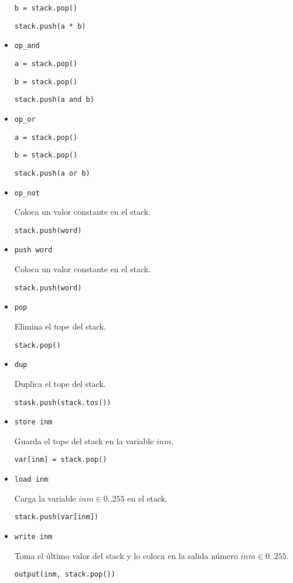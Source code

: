 \begin{itemize}
  \texttt{b = stack.pop()}

  \texttt{stack.push(a * b)}

\item \texttt{op\_and}

  \texttt{a = stack.pop()}

  \texttt{b = stack.pop()}

  \texttt{stack.push(a and b)}

\item \texttt{op\_or}

  \texttt{a = stack.pop()}

  \texttt{b = stack.pop()}

  \texttt{stack.push(a or b)}

\item \texttt{op\_not}

  Coloca un valor constante en el stack.

  \texttt{stack.push(word)}

\item \texttt{push word}

  Coloca un valor constante en el stack.

  \texttt{stack.push(word)}

\item \texttt{pop}

  Elimina el tope del stack.

  \texttt{stack.pop()}

\item \texttt{dup}

  Duplica el tope del stack.

  \texttt{stask.push(stack.tos())}

\item \texttt{store inm}

  Guarda el tope del stack en la variable $inm$.

  \texttt{var[inm] = stack.pop()}

\item \texttt{load inm}

  Carga la variable $inm \in {0..255}$ en el stack.

  \texttt{stack.push(var[inm])}

\item \texttt{write inm}

  Toma el último valor del stack y lo coloca en la 
  salida número $inm \in {0..255}$.

  \texttt{output(inm, stack.pop())}

\end{itemize}


